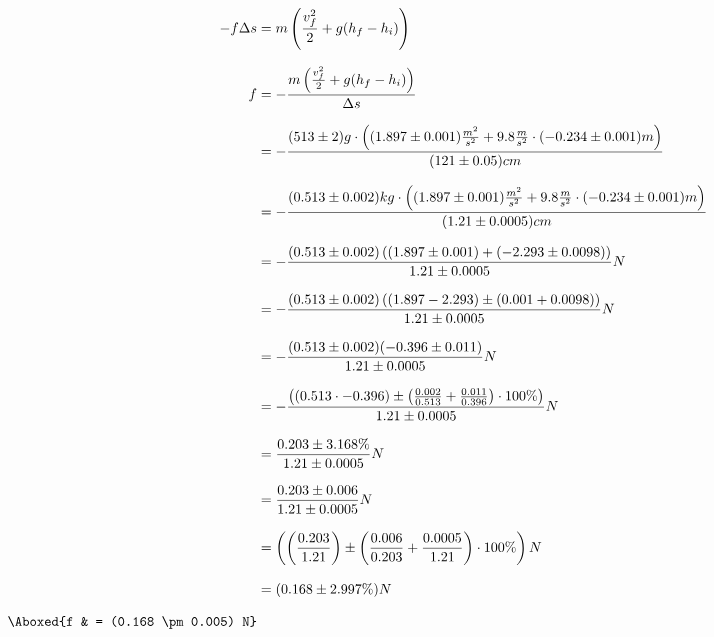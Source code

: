 \documentclass{article}
\begin{document}
\begin{align*}
    -f \Delta s & = m \left( \frac{v_f^2}{2} + g(h_f - h_i) \right)                                                                                                        \\[8pt]
    f           & = - \frac{m \left( \frac{v_f^2}{2} + g(h_f - h_i) \right)}{\Delta s}                                                                                     \\[8pt]
                & = - \frac{(513 \pm 2)g \cdot \left( (1.897 \pm 0.001) \frac{m^2}{s^2} + 9.8 \frac{m}{s^2} \cdot (-0.234 \pm 0.001)m \right)}{(121 \pm 0.05)cm}           \\[8pt]
                & = - \frac{(0.513 \pm 0.002)kg \cdot \left( (1.897 \pm 0.001) \frac{m^2}{s^2} + 9.8 \frac{m}{s^2} \cdot (-0.234 \pm 0.001)m \right)}{(1.21 \pm 0.0005)cm} \\[8pt]
                & = - \frac{(0.513 \pm 0.002) \left( (1.897 \pm 0.001) + (-2.293 \pm 0.0098) \right)}{1.21 \pm 0.0005} N                                                   \\[8pt]
                & = - \frac{(0.513 \pm 0.002) \left( (1.897 - 2.293) \pm (0.001 + 0.0098) \right)}{1.21 \pm 0.0005} N                                                      \\[8pt]
                & = - \frac{(0.513 \pm 0.002) (-0.396 \pm 0.011)}{1.21 \pm 0.0005} N                                                                                       \\[8pt]
                & = -\frac{\left( (0.513 \cdot -0.396) \pm \left( \frac{0.002}{0.513} + \frac{0.011}{0.396} \right) \cdot 100\% \right)}{1.21 \pm 0.0005} N                \\[8pt]
                & = \frac{0.203 \pm 3.168\%}{1.21 \pm 0.0005} N                                                                                                            \\[8pt]
                & = \frac{0.203 \pm 0.006}{1.21 \pm 0.0005} N                                                                                                              \\[8pt]
                & = \left( \left( \frac{0.203}{1.21} \right) \pm \left( \frac{0.006}{0.203} + \frac{0.0005}{1.21} \right) \cdot 100\% \right) N                            \\[8pt]
                & = (0.168 \pm 2.997\%) N                                                                                                                                  \\[8pt]
    \Aboxed{f   & = (0.168 \pm 0.005) N}
\end{align*}
\end{document}

